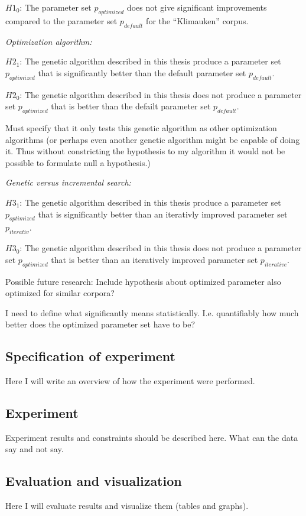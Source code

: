 \(H1_{0}\): The parameter set \(p_{optimized}\) does not give significant improvements compared to the parameter set \(p_{default}\) for the ``Klimauken'' corpus.


\emph{Optimization algorithm:}

\(H2_{1}\): The genetic algorithm described in this thesis produce a parameter set \(p_{optimized}\) that is significantly better than the default parameter set \(p_{default}\).

\(H2_{0}\): The genetic algorithm described in this thesis does not produce a parameter set \(p_{optimized}\) that is better than the defailt parameter set \(p_{default}\).

Must specify that it only tests this genetic algorithm as other optimization algorithms (or perhaps even another genetic algorithm might be capable of doing it. Thus without constricting the hypothesis to my algorithm it would not be possible to formulate null a hypothesis.)

\emph{Genetic versus incremental search:}

\(H3_{1}\): The genetic algorithm described in this thesis produce a parameter set \(p_{optimized}\) that is significantly better than an iterativly improved parameter set \(p_{iterativ}\).

\(H3_{0}\): The genetic algorithm described in this thesis does not produce a parameter set \(p_{optimized}\) that is better than an iteratively improved parameter set \(p_{iterative}\).

Possible future research:
Include hypothesis about optimized parameter also optimized for similar corpora?

I need to define what significantly means statistically. I.e. quantifiably how much better does the optimized parameter set have to be?


\subsection{Specification of experiment}
Here I will write an overview of how the experiment were performed.

\subsection{Experiment}
Experiment results and constraints should be described here. What can the data say and not say.

\subsection{Evaluation and visualization}
Here I will evaluate results and visualize them (tables and graphs).



